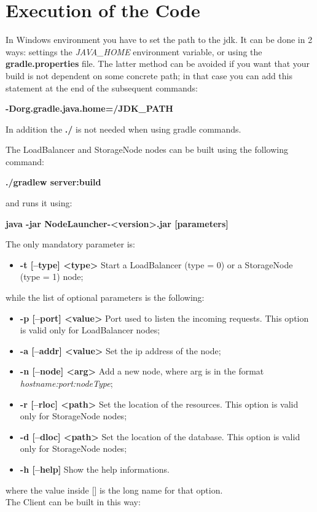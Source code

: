 \documentclass[12pt, a4paper, oneside] {book}
\begin{document}
\chapter{Execution of the Code}

In Windows environment you have to set the path to the jdk. It can be done in 2 ways: settings the \emph{JAVA\_HOME} environment variable, or using the \textbf{gradle.properties} file.
The latter method can be avoided if you want that your build is not dependent on some concrete path; in that case you can add this statement at the end of the subsequent commands:

\begin{center}
\textbf{-Dorg.gradle.java.home=/JDK\_PATH}
\end{center}
In addition the \textbf{./} is not needed when using gradle commands.

The LoadBalancer and StorageNode nodes can be built using the following command:

\begin{center}
\textbf{./gradlew server:build}
\end{center}
and runs it using:

\begin{center}
\textbf{java -jar NodeLauncher-<version>.jar [parameters]}
\end{center}
The only mandatory parameter is:

\begin{itemize}
  \item \textbf{-t [--type] <type>} Start a LoadBalancer (type = 0) or a StorageNode (type = 1) node;
\end{itemize}
while the list of optional parameters is the following:

\begin{itemize}
  \item \textbf{-p [--port] <value>} Port used to listen the incoming requests. This option is valid only for LoadBalancer nodes;
  \item \textbf{-a [--addr] <value>} Set the ip address of the node;
  \item \textbf{-n [--node] <arg>} Add a new node, where arg is in the format \emph{hostname:port:nodeType};
  \item \textbf{-r [--rloc] <path>} Set the location of the resources. This option is valid only for StorageNode nodes;
  \item \textbf{-d [--dloc] <path>} Set the location of the database. This option is valid only for StorageNode nodes;
  \item \textbf{-h [--help]} Show the help informations.
\end{itemize}
where the value inside [] is the long name for that option.\\
The Client can be built in this way:
\end{document}
